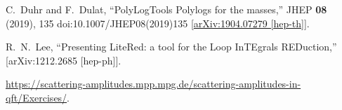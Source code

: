 C.~Duhr and F.~Dulat,
``PolyLogTools \textemdash{} Polylogs for the masses,''
JHEP \textbf{08} (2019), 135
doi:10.1007/JHEP08(2019)135
[\href{https://arxiv.org/abs/1904.07279}{arXiv:1904.07279 [hep-th]}].

R.~N.~Lee,
``Presenting LiteRed: a tool for the Loop InTEgrals REDuction,''
[arXiv:1212.2685 [hep-ph]].

\href{https://scattering-amplitudes.mpp.mpg.de/scattering-amplitudes-in-qft/Exercises/}{https://scattering-amplitudes.mpp.mpg.de/scattering-amplitudes-in-qft/Exercises/}.